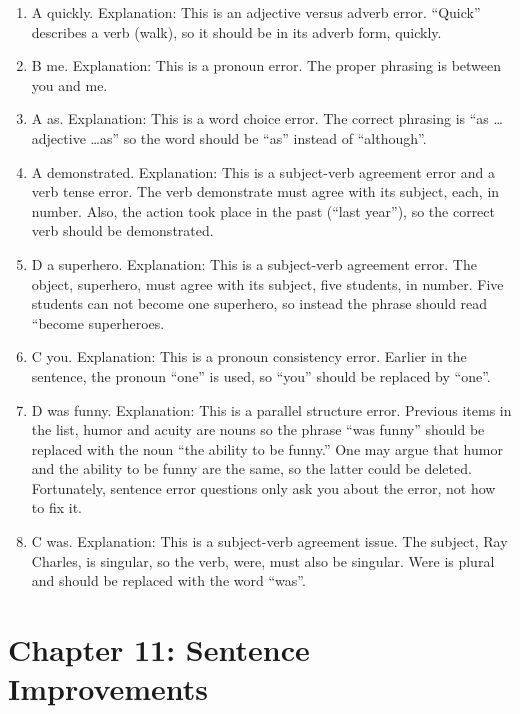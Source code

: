 \begin{enumerate}
\item A quickly. Explanation: This is an adjective versus adverb error. ``Quick'' describes a verb (walk), so it should be in its adverb form, quickly. 

\item B me. Explanation: This is a pronoun error. The proper phrasing is between you and me. 

\item A as. Explanation: This is a word choice error. The correct phrasing is ``as \ldots adjective \ldots as'' so the word should be ``as'' instead of ``although''. 

\item A demonstrated. Explanation: This is a subject-verb agreement error and a verb tense error. The verb demonstrate must agree with its subject, each, in number. Also, the action took place in the past (``last year''), so the correct verb should be demonstrated. 

\item D a superhero. Explanation: This is a subject-verb agreement error. The object, superhero, must agree with its subject, five students, in number. Five students can not become one superhero, so instead the phrase should read ``become superheroes. 

\item C you.  Explanation: This is a pronoun consistency error. Earlier in the sentence, the pronoun ``one'' is used, so ``you'' should be replaced by ``one''. 

\item D was funny. Explanation: This is a parallel structure error. Previous items in the list, humor and acuity are nouns so the phrase ``was funny'' should be replaced with the noun ``the ability to be funny.'' One may argue that humor and the ability to be funny are the same, so the latter could be deleted. Fortunately, sentence error questions only ask you about the error, not how to fix it. 

\item C was. Explanation: This is a subject-verb agreement issue. The subject, Ray Charles, is singular, so the verb, were, must also be singular. Were is plural and should be replaced with the word ``was''. 
\end{enumerate}




\section{Chapter 11: Sentence Improvements}

